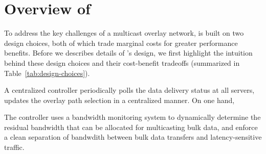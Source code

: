 \section{Overview of \name}
\label{sec:overview}

To address the key challenges of a multicast overlay network,
\name is built on two design choices, both of which
trade marginal costs for greater performance benefits. 
Before we describes details of \name's design, we first
highlight the intuition behind these design choices and
their cost-benefit tradeoffs 
(summarized in Table~\ref{tab:design-choices}).


A centralized controller periodically polls the data delivery
status at all servers, updates the overlay path selection in a
centralized manner.
On one hand, 

The controller uses a bandwidth monitoring system to dynamically
determine the residual bandwidth that can be allocated for 
multicasting bulk data, and enforce a clean separation of 
bandwdith between bulk data transfers and latency-sensitive 
traffic.






